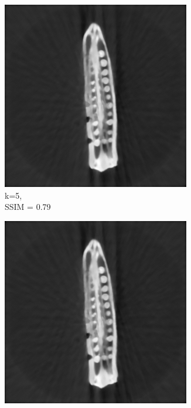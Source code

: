 \documentclass[journal]{IEEEtran}
\begin{document}
\begin{figure}[h]
    \begin{subfigure}[b]{0.24\linewidth}
        \includegraphics[width=\textwidth]{../images/okra/post_TCI/2D/48_views/tuning_k/weighted_prior_kk_5_lambda_prior_0.700000.png}
        \caption{k=5,\\ SSIM = 0.79}
     \end{subfigure}     
  \begin{subfigure}[b]{0.24\linewidth}
        \includegraphics[width=\textwidth]{../images/okra/post_TCI/2D/48_views/tuning_k/weighted_prior_kk_10_lambda_prior_0.700000.png}

\end{subfigure}
\end{figure}
\end{document}
